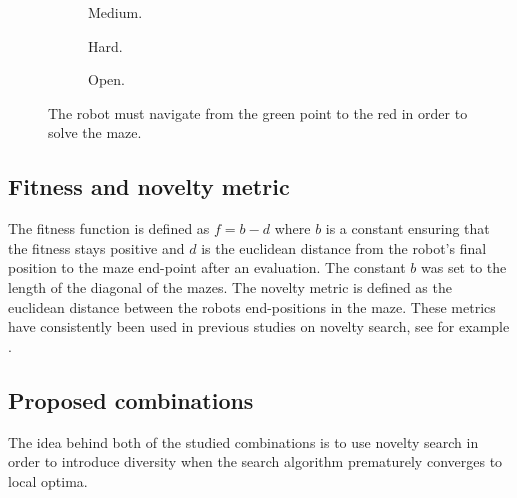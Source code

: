 \begin{figure}[H]
    \captionsetup[subfigure]{justification=centering}
    \centering
    \begin{mdframed}
        \begin{subfigure}[b]{0.3\textwidth}
            \centering
            \scalebox{0.25}{}
            \caption{Medium.}
        \end{subfigure}
        \begin{subfigure}[b]{0.3\textwidth}
            \centering
            \scalebox{0.25}{}
            \caption{Hard.}
        \end{subfigure}
        \begin{subfigure}[b]{0.3\textwidth}
            \centering
            \scalebox{0.25}{}
            \caption{Open.}
        \end{subfigure}
    \end{mdframed}
    \caption{The robot must navigate from the green point to the red in order to solve the maze.}
    \label{mazes}
\end{figure}


\subsection{Fitness and novelty metric}
\label{subsection:metrics}
The fitness function is defined as $f = b - d$ where $b$ is a constant ensuring that the fitness stays positive
and $d$ is the euclidean distance from the robot's final position to the maze end-point after an evaluation.
The constant $b$ was set to the length of the diagonal of the mazes.
The novelty metric is defined as the euclidean distance between the robots end-positions in the maze.
These metrics have consistently been used in previous studies on novelty search, see for example \cite{ns_study,novelty_alone}.

\subsection{Proposed combinations}
\label{subsection:linearisation}
The idea behind both of the studied combinations is to use novelty search in order to introduce diversity
when the search algorithm prematurely converges to local optima.

